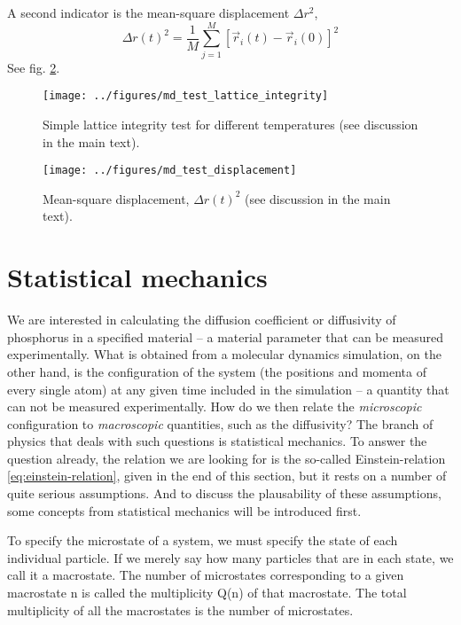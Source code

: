 \documentclass[11pt]{scrbook}   %
\begin{document}
A second indicator is the mean-square displacement $\Delta r^2$,
\begin{equation}
  \Delta r(t)^2 = \frac{1}{M}\sum_{j=1}^M [\vec{r}_i(t)-\vec{r}_i(0)]^2
\end{equation}
See fig. \ref{fig:md_test_displacement}.

\begin{figure}[htbp]
  \begin{center}
    \texttt{[image: ../figures/md\_test\_lattice\_integrity]}
  \end{center}
  \caption{Simple lattice integrity test for different temperatures (see discussion in the main text).}
  \label{fig:md_test_lattice_integrity}
\end{figure}

\begin{figure}[htbp]
  \begin{center}
    \texttt{[image: ../figures/md\_test\_displacement]}
  \end{center}
  \caption{Mean-square displacement, $\Delta r(t)^2$ (see discussion in the main text).}
  \label{fig:md_test_displacement}
\end{figure}

\section{Statistical mechanics}

We are interested in calculating the diffusion coefficient or diffusivity of phosphorus in a specified material -- 
a material parameter that can be measured experimentally.
What is obtained from a molecular dynamics simulation, on the other hand, is the configuration of the system (the positions and momenta of every single atom) at any given time included in the simulation -- a quantity that can not be measured experimentally. 
How do we then relate the \emph{microscopic} configuration to \emph{macroscopic} quantities, such as the diffusivity?
The branch of physics that deals with such questions is statistical mechanics. 
To answer the question already, the relation we are looking for is the so-called Einstein-relation \eqref{eq:einstein-relation}, given in the end of this section, but it rests on a number of quite serious assumptions. 
And to discuss the plausability of these assumptions, some concepts from statistical mechanics will be introduced first.

To specify the microstate of a system, we must specify the state of each individual particle. If we merely say how many particles that are in each state, we call it a macrostate. The number of microstates corresponding to a given macrostate n is called the multiplicity Q(n) of that macrostate. The total multiplicity of all the macrostates is the number of microstates.
\end{document}
